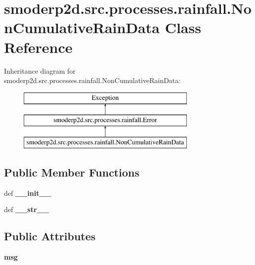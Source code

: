 \hypertarget{classsmoderp2d_1_1src_1_1processes_1_1rainfall_1_1NonCumulativeRainData}{\section{smoderp2d.\-src.\-processes.\-rainfall.\-Non\-Cumulative\-Rain\-Data Class Reference}
\label{classsmoderp2d_1_1src_1_1processes_1_1rainfall_1_1NonCumulativeRainData}
}
Inheritance diagram for smoderp2d.\-src.\-processes.\-rainfall.\-Non\-Cumulative\-Rain\-Data\-:\begin{figure}[H]
\begin{center}
\leavevmode
\includegraphics[height=3.000000cm]{d0/d7c/classsmoderp2d_1_1src_1_1processes_1_1rainfall_1_1NonCumulativeRainData}
\end{center}
\end{figure}
\subsection*{Public Member Functions}
\begin{DoxyCompactItemize}
\item 
\hypertarget{classsmoderp2d_1_1src_1_1processes_1_1rainfall_1_1NonCumulativeRainData_a8c1819953f50758356fecb2e21298949}{def {\bfseries \-\_\-\-\_\-init\-\_\-\-\_\-}}\label{classsmoderp2d_1_1src_1_1processes_1_1rainfall_1_1NonCumulativeRainData_a8c1819953f50758356fecb2e21298949}

\item 
\hypertarget{classsmoderp2d_1_1src_1_1processes_1_1rainfall_1_1NonCumulativeRainData_ae724b18ea56d343746cdcec410a591fe}{def {\bfseries \-\_\-\-\_\-str\-\_\-\-\_\-}}\label{classsmoderp2d_1_1src_1_1processes_1_1rainfall_1_1NonCumulativeRainData_ae724b18ea56d343746cdcec410a591fe}

\end{DoxyCompactItemize}
\subsection*{Public Attributes}
\begin{DoxyCompactItemize}
\item 
\hypertarget{classsmoderp2d_1_1src_1_1processes_1_1rainfall_1_1NonCumulativeRainData_a238df79989636c9e0df402640d1d2a57}{{\bfseries msg}}\label{classsmoderp2d_1_1src_1_1processes_1_1rainfall_1_1NonCumulativeRainData_a238df79989636c9e0df402640d1d2a57}

\end{DoxyCompactItemize}


